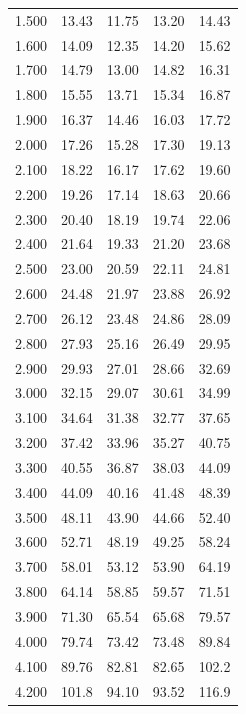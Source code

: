 \documentclass[a4paper]{IEEEtran}
\begin{document}
\begin{table}[ht]
\begin{tabular}{c|cccc}
            1.500 & 13.43 & 11.75 & 13.20 & 14.43 \\
            1.600 & 14.09 & 12.35 & 14.20 & 15.62 \\
            1.700 & 14.79 & 13.00 & 14.82 & 16.31 \\
            1.800 & 15.55 & 13.71 & 15.34 & 16.87 \\
            1.900 & 16.37 & 14.46 & 16.03 & 17.72 \\
            2.000 & 17.26 & 15.28 & 17.30 & 19.13 \\
            2.100 & 18.22 & 16.17 & 17.62 & 19.60 \\
            2.200 & 19.26 & 17.14 & 18.63 & 20.66 \\
            2.300 & 20.40 & 18.19 & 19.74 & 22.06 \\
            2.400 & 21.64 & 19.33 & 21.20 & 23.68 \\
            2.500 & 23.00 & 20.59 & 22.11 & 24.81 \\
            2.600 & 24.48 & 21.97 & 23.88 & 26.92 \\
            2.700 & 26.12 & 23.48 & 24.86 & 28.09 \\
            2.800 & 27.93 & 25.16 & 26.49 & 29.95 \\
            2.900 & 29.93 & 27.01 & 28.66 & 32.69 \\
            3.000 & 32.15 & 29.07 & 30.61 & 34.99 \\
            3.100 & 34.64 & 31.38 & 32.77 & 37.65 \\
            3.200 & 37.42 & 33.96 & 35.27 & 40.75 \\
            3.300 & 40.55 & 36.87 & 38.03 & 44.09 \\
            3.400 & 44.09 & 40.16 & 41.48 & 48.39 \\
            3.500 & 48.11 & 43.90 & 44.66 & 52.40 \\
            3.600 & 52.71 & 48.19 & 49.25 & 58.24 \\
            3.700 & 58.01 & 53.12 & 53.90 & 64.19 \\
            3.800 & 64.14 & 58.85 & 59.57 & 71.51 \\
            3.900 & 71.30 & 65.54 & 65.68 & 79.57 \\
            4.000 & 79.74 & 73.42 & 73.48 & 89.84 \\
            4.100 & 89.76 & 82.81 & 82.65 & 102.2 \\
            4.200 & 101.8 & 94.10 & 93.52 & 116.9 \\

\end{tabular}
\end{table}
\end{document}

